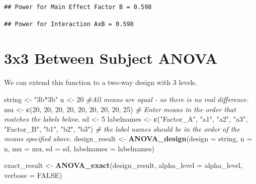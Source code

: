 \documentclass[
]{book}
\newenvironment{Shaded}{\begin{snugshade}}{\end{snugshade}}
\newcommand{\CommentTok}[1]{\textcolor[rgb]{0.56,0.35,0.01}{\textit{#1}}}
\newcommand{\DataTypeTok}[1]{\textcolor[rgb]{0.13,0.29,0.53}{#1}}
\newcommand{\DecValTok}[1]{\textcolor[rgb]{0.00,0.00,0.81}{#1}}
\newcommand{\KeywordTok}[1]{\textcolor[rgb]{0.13,0.29,0.53}{\textbf{#1}}}
\newcommand{\NormalTok}[1]{#1}
\newcommand{\OtherTok}[1]{\textcolor[rgb]{0.56,0.35,0.01}{#1}}
\newcommand{\StringTok}[1]{\textcolor[rgb]{0.31,0.60,0.02}{#1}}
\begin{document}
\begin{verbatim}
## Power for Main Effect Factor B = 0.598
\end{verbatim}

\begin{verbatim}
## Power for Interaction AxB = 0.598
\end{verbatim}

\hypertarget{x3-between-subject-anova}{%
\section{3x3 Between Subject ANOVA}\label{x3-between-subject-anova}}

We can extend this function to a two-way design with 3 levels.

\begin{Shaded}
\begin{Highlighting}[]
\NormalTok{string <-}\StringTok{ "3b*3b"}
\NormalTok{n <-}\StringTok{ }\DecValTok{20}
\CommentTok{#All means are equal - so there is no real difference.}
\NormalTok{mu <-}\StringTok{ }\KeywordTok{c}\NormalTok{(}\DecValTok{20}\NormalTok{, }\DecValTok{20}\NormalTok{, }\DecValTok{20}\NormalTok{, }\DecValTok{20}\NormalTok{, }\DecValTok{20}\NormalTok{, }\DecValTok{20}\NormalTok{, }\DecValTok{20}\NormalTok{, }\DecValTok{20}\NormalTok{, }\DecValTok{25}\NormalTok{) }
\CommentTok{# Enter means in the order that matches the labels below.}
\NormalTok{sd <-}\StringTok{ }\DecValTok{5}
\NormalTok{labelnames <-}\StringTok{ }\KeywordTok{c}\NormalTok{(}\StringTok{"Factor_A"}\NormalTok{, }\StringTok{"a1"}\NormalTok{, }\StringTok{"a2"}\NormalTok{, }\StringTok{"a3"}\NormalTok{, }\StringTok{"Factor_B"}\NormalTok{, }\StringTok{"b1"}\NormalTok{, }\StringTok{"b2"}\NormalTok{, }\StringTok{"b3"}\NormalTok{) }
\CommentTok{# the label names should be in the order of the means specified above.}
\NormalTok{design_result <-}\StringTok{ }\KeywordTok{ANOVA_design}\NormalTok{(}\DataTypeTok{design =}\NormalTok{ string,}
                   \DataTypeTok{n =}\NormalTok{ n, }
                   \DataTypeTok{mu =}\NormalTok{ mu, }
                   \DataTypeTok{sd =}\NormalTok{ sd, }
                   \DataTypeTok{labelnames =}\NormalTok{ labelnames)}



\NormalTok{exact_result <-}\StringTok{ }\KeywordTok{ANOVA_exact}\NormalTok{(design_result,}
                            \DataTypeTok{alpha_level =}\NormalTok{ alpha_level,}
                            \DataTypeTok{verbose =} \OtherTok{FALSE}\NormalTok{)}
\end{Highlighting}
\end{Shaded}
\end{document}
